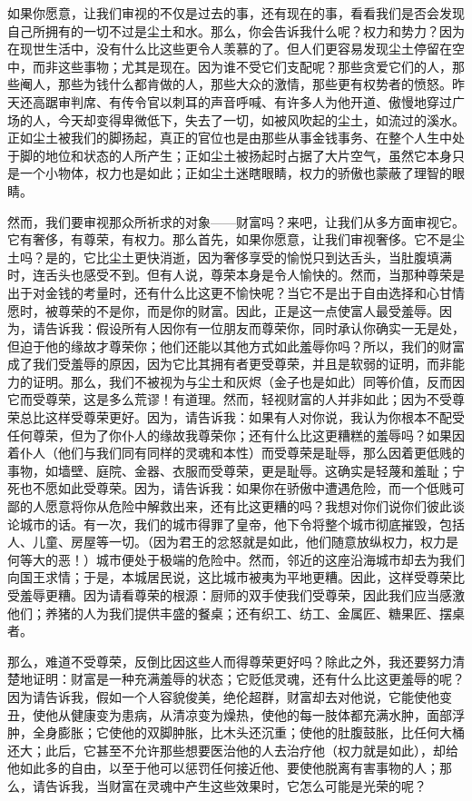 如果你愿意，让我们审视的不仅是过去的事，还有现在的事，看看我们是否会发现自己所拥有的一切不过是尘土和水。那么，你会告诉我什么呢？权力和势力？因为在现世生活中，没有什么比这些更令人羡慕的了。但人们更容易发现尘土停留在空中，而非这些事物；尤其是现在。因为谁不受它们支配呢？那些贪爱它们的人，那些阉人，那些为钱什么都肯做的人，那些大众的激情，那些更有权势者的愤怒。昨天还高踞审判席、有传令官以刺耳的声音呼喊、有许多人为他开道、傲慢地穿过广场的人，今天却变得卑微低下，失去了一切，如被风吹起的尘土，如流过的溪水。正如尘土被我们的脚扬起，真正的官位也是由那些从事金钱事务、在整个人生中处于脚的地位和状态的人所产生；正如尘土被扬起时占据了大片空气，虽然它本身只是一个小物体，权力也是如此；正如尘土迷瞎眼睛，权力的骄傲也蒙蔽了理智的眼睛。\par

然而，我们要审视那众所祈求的对象——财富吗？来吧，让我们从多方面审视它。它有奢侈，有尊荣，有权力。那么首先，如果你愿意，让我们审视奢侈。它不是尘土吗？是的，它比尘土更快消逝，因为奢侈享受的愉悦只到达舌头，当肚腹填满时，连舌头也感受不到。但有人说，尊荣本身是令人愉快的。然而，当那种尊荣是出于对金钱的考量时，还有什么比这更不愉快呢？当它不是出于自由选择和心甘情愿时，被尊荣的不是你，而是你的财富。因此，正是这一点使富人最受羞辱。因为，请告诉我：假设所有人因你有一位朋友而尊荣你，同时承认你确实一无是处，但迫于他的缘故才尊荣你；他们还能以其他方式如此羞辱你吗？所以，我们的财富成了我们受羞辱的原因，因为它比其拥有者更受尊荣，并且是软弱的证明，而非能力的证明。那么，我们不被视为与尘土和灰烬（金子也是如此）同等价值，反而因它而受尊荣，这是多么荒谬！有道理。然而，轻视财富的人并非如此；因为不受尊荣总比这样受尊荣更好。因为，请告诉我：如果有人对你说，我认为你根本不配受任何尊荣，但为了你仆人的缘故我尊荣你；还有什么比这更糟糕的羞辱吗？如果因着仆人（他们与我们同有同样的灵魂和本性）而受尊荣是耻辱，那么因着更低贱的事物，如墙壁、庭院、金器、衣服而受尊荣，更是耻辱。这确实是轻蔑和羞耻；宁死也不愿如此受尊荣。因为，请告诉我：如果你在骄傲中遭遇危险，而一个低贱可鄙的人愿意将你从危险中解救出来，还有比这更糟的吗？我想对你们说你们彼此谈论城市的话。有一次，我们的城市得罪了皇帝，他下令将整个城市彻底摧毁，包括人、儿童、房屋等一切。（因为君王的忿怒就是如此，他们随意放纵权力，权力是何等大的恶！）城市便处于极端的危险中。然而，邻近的这座沿海城市却去为我们向国王求情；于是，本城居民说，这比城市被夷为平地更糟。因此，这样受尊荣比受羞辱更糟。因为请看尊荣的根源：厨师的双手使我们受尊荣，因此我们应当感激他们；养猪的人为我们提供丰盛的餐桌；还有织工、纺工、金属匠、糖果匠、摆桌者。\par

那么，难道不受尊荣，反倒比因这些人而得尊荣更好吗？除此之外，我还要努力清楚地证明：财富是一种充满羞辱的状态；它贬低灵魂，还有什么比这更羞辱的呢？因为请告诉我，假如一个人容貌俊美，绝伦超群，财富却去对他说，它能使他变丑，使他从健康变为患病，从清凉变为燥热，使他的每一肢体都充满水肿，面部浮肿，全身膨胀；它使他的双脚肿胀，比木头还沉重；使他的肚腹鼓胀，比任何大桶还大；此后，它甚至不允许那些想要医治他的人去治疗他（权力就是如此），却给他如此多的自由，以至于他可以惩罚任何接近他、要使他脱离有害事物的人；那么，请告诉我，当财富在灵魂中产生这些效果时，它怎么可能是光荣的呢？\par


